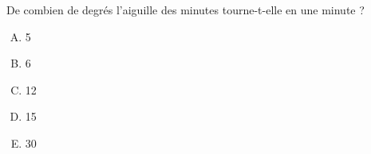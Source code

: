 De combien de degrés l'aiguille des minutes tourne-t-elle en une minute ?
\begin{multicols}{5}
  \begin{enumerate}[A)]
  \item 5\degres
  \item 6\degres
  \item 12\degres
  \item 15\degres
  \item 30\degres
  \end{enumerate}
\end{multicols}